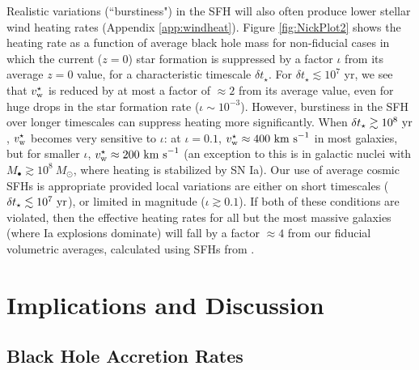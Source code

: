 \documentclass[usenatbib,fleqn]{mn2e}
\begin{document}
Realistic variations (``burstiness") in the SFH
will also often produce lower stellar wind heating rates (Appendix
\ref{app:windheat}).  Figure \ref{fig:NickPlot2} shows the heating
rate as a function of average black hole mass for non-fiducial cases
in which the current ($z = 0$) star formation is suppressed by a
factor $\iota$ from its average $z = 0$ value, for a characteristic
timescale $\delta t_{\star}$.  For $\delta t_{\star} \lesssim 10^{7}$
yr, we see that $v_{\rm w}^{\star}$ is reduced by at most a factor of
$\approx 2$ from its average value, even for huge drops in the star
formation rate ($\iota \sim 10^{-3}$).  However, burstiness in the
SFH over longer timescales can suppress heating
more significantly.  When $\delta t_{\star} \gtrsim 10^8~{\rm yr}$,
$v_{\rm w}^\star$ becomes very sensitive to $\iota$: at $\iota=0.1$,
$v_{\rm w}^\star \approx 400~{\rm km~s}^{-1}$ in most galaxies, but
for smaller $\iota$, $v_{\rm w}^\star \approx 200~{\rm km~s}^{-1}$ (an
exception to this is in galactic nuclei with $M_\bullet \gtrsim
10^8~M_\odot$, where heating is stabilized by SN Ia).  Our use
of average cosmic SFHs is appropriate provided
local variations are either on short timescales ($\delta t_{\star}
\lesssim 10^7~{\rm yr}$), or limited in magnitude ($\iota \gtrsim
0.1$).  If both of these conditions are violated, then the effective
heating rates for all but the most massive galaxies (where Ia
explosions dominate) will fall by a factor $\approx 4$ from our
fiducial volumetric averages, calculated using SFHs from \citet{MosterNaab+:2013a}.


\section{Implications and Discussion}
\label{sec:discussion}

\subsection{Black Hole Accretion Rates}
\label{sec:mdot}
\end{document}
